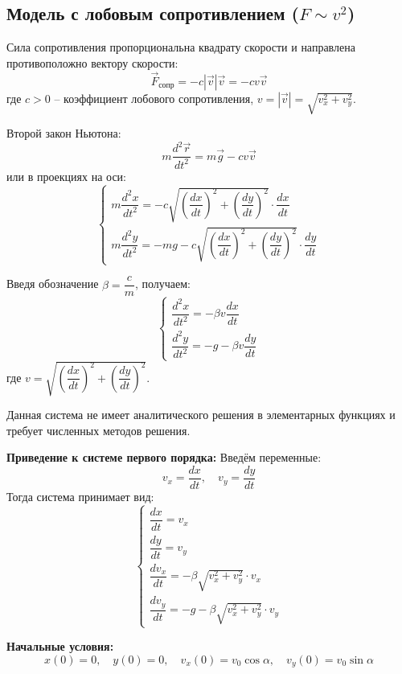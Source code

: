 \begin{center}
    \subsection{Модель с лобовым сопротивлением ($F \sim v^2$)}
\end{center}

Сила сопротивления пропорциональна квадрату скорости и направлена противоположно вектору скорости:
\[
\vec{F}_{\text{сопр}} = -c|\vec{v}|\vec{v} = -c v \vec{v}
\]
где $c > 0$ -- коэффициент лобового сопротивления, $v = |\vec{v}| = \sqrt{v_x^2 + v_y^2}$.

Второй закон Ньютона:
\[
m\dfrac{d^2\vec{r}}{dt^2} = m\vec{g} - c v \vec{v}
\]
или в проекциях на оси:
\[
\begin{cases}
m\dfrac{d^2x}{dt^2} = -c\sqrt{\left(\dfrac{dx}{dt}\right)^2 + \left(\dfrac{dy}{dt}\right)^2} \cdot \dfrac{dx}{dt} \\[1em]
m\dfrac{d^2y}{dt^2} = -mg - c\sqrt{\left(\dfrac{dx}{dt}\right)^2 + \left(\dfrac{dy}{dt}\right)^2} \cdot \dfrac{dy}{dt}
\end{cases}
\]

Введя обозначение $\beta = \dfrac{c}{m}$, получаем:
\[
\begin{cases}
\dfrac{d^2x}{dt^2} = -\beta v \dfrac{dx}{dt} \\[1em]
\dfrac{d^2y}{dt^2} = -g - \beta v \dfrac{dy}{dt}
\end{cases}
\]
где $v = \sqrt{\left(\dfrac{dx}{dt}\right)^2 + \left(\dfrac{dy}{dt}\right)^2}$.

\Solution Данная система не имеет аналитического решения в элементарных функциях и требует численных методов решения.

\textbf{Приведение к системе первого порядка:}
Введём переменные:
\[
v_x = \dfrac{dx}{dt}, \quad v_y = \dfrac{dy}{dt}
\]
Тогда система принимает вид:
\[
\begin{cases}
\dfrac{dx}{dt} = v_x \\[1em]
\dfrac{dy}{dt} = v_y \\[1em]
\dfrac{dv_x}{dt} = -\beta \sqrt{v_x^2 + v_y^2} \cdot v_x \\[1em]
\dfrac{dv_y}{dt} = -g - \beta \sqrt{v_x^2 + v_y^2} \cdot v_y
\end{cases}
\]

\textbf{Начальные условия:}
\[
x(0) = 0, \quad y(0) = 0, \quad v_x(0) = v_0 \cos\alpha, \quad v_y(0) = v_0 \sin\alpha
\]

\newpage 

